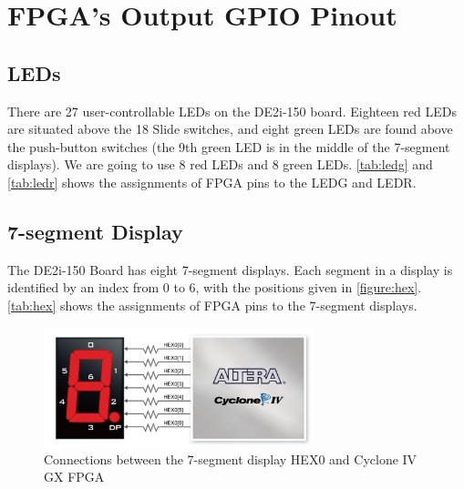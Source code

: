 %
%
%
%
%

\chapter{FPGA's Output GPIO Pinout}

    \section{LEDs}
        There are 27 user-controllable LEDs on the DE2i-150 board. Eighteen red LEDs are situated above
        the 18 Slide switches, and eight green LEDs are found above the push-button switches (the 9th
        green LED is in the middle of the 7-segment displays). We are going to use 8 red LEDs and 8 green LEDs. \autoref{tab:ledg} and \autoref{tab:ledr} shows the assignments of FPGA pins to the LEDG and LEDR. 
        
    \section{7-segment Display}
        The DE2i-150 Board has eight 7-segment displays.
        Each segment in a display is identified by an index from 0 to 6, with the positions given in \autoref{figure:hex}. \autoref{tab:hex} shows the assignments of FPGA pins to the 7-segment displays.
        
            \begin{figure}[!ht]
                \begin{center}
                    \includegraphics[width= 0.7\textwidth]{figures/chap2/hex.png}
                    \caption{\label{figure:hex} Connections between the 7-segment display HEX0 and Cyclone IV GX FPGA}
                \end{center}
            \end{figure}
    
